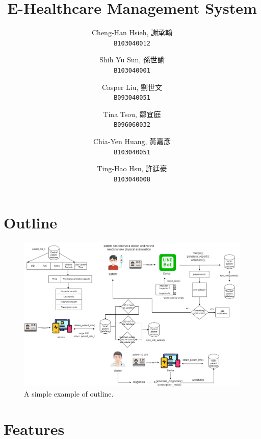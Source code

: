 \documentclass{article}
\begin{document}
\title{E-Healthcare Management System}
\author{
  Cheng-Han Hsieh, 謝承翰\\
  \texttt{B103040012}
  \and
  Shih Yu Sun, 孫世諭\\
  \texttt{B103040001}
  \and
  Casper Liu, 劉世文\\
  \texttt{B093040051}
  \and
  Tina Tsou, 鄒宜庭\\
  \texttt{B096060032}
  \and
  Chia-Yen Huang, 黃嘉彥\\
  \texttt{B103040051}
  \and
  Ting-Hao Hsu, 許廷豪\\
  \texttt{B103040008}
}

\maketitle

\section{Outline}
\label{sec:outline}

  \begin{figure}[h]
    \centering
    \includegraphics[scale = 0.3]{asset/flowchart.png}
    \caption{A simple example of outline.}
    \label{fig:flowchart}
  \end{figure}


\section{Features}
\label{sec:features}
\end{document}
